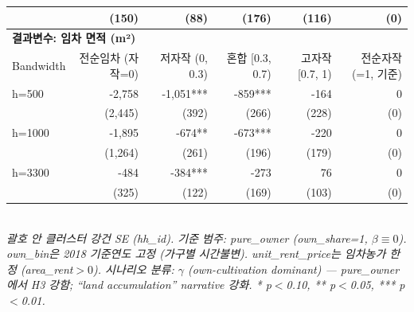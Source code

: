 \begin{table}[t]
\begin{tabular}{lrrrrr}
    & (150) & (88) & (176) & (116) & (0) \\
\midrule
\multicolumn{6}{l}{\textbf{결과변수: 임차 면적 (m²)}} \\
Bandwidth & 전순임차 (자작=0) & 저자작 (0, 0.3) & 혼합 [0.3, 0.7) & 고자작 [0.7, 1) & 전순자작 (=1, 기준) \\
\midrule
h=500 & -2,758 & -1,051*** & -859*** & -164 & 0 \\
    & (2,445) & (392) & (266) & (228) & (0) \\
h=1000 & -1,895 & -674** & -673*** & -220 & 0 \\
    & (1,264) & (261) & (196) & (179) & (0) \\
h=3300 & -484 & -384*** & -273 & 76 & 0 \\
    & (325) & (122) & (169) & (103) & (0) \\
\midrule
\bottomrule
\end{tabular}
\\
\footnotesize\textit{괄호 안 클러스터 강건 SE (hh\_id). 기준 범주: pure\_owner (own\_share=1, $\beta \equiv 0$). own\_bin은 2018 기준연도 고정 (가구별 시간불변). unit\_rent\_price는 임차농가 한정 (area\_rent$>0$). 시나리오 분류: $\gamma$ (own-cultivation dominant) --- pure\_owner에서 H3 강함; ``land accumulation'' narrative 강화. * p$<$0.10, ** p$<$0.05, *** p$<$0.01.}
\end{table}

